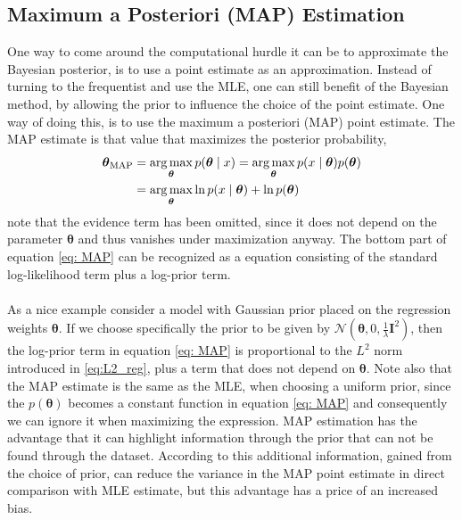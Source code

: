 \subsection{Maximum a Posteriori (MAP) Estimation}
One way to come around the computational hurdle it can be to approximate the Bayesian posterior, is to use a point estimate as an approximation. Instead of turning to the frequentist and use the MLE, one can still benefit of the Bayesian method, by allowing the prior to influence the choice of the point estimate. One way of doing this, is to use the maximum a posteriori (MAP) point estimate. The MAP estimate is that value that maximizes the posterior probability,
\begin{equation}\label{eq: MAP}
  \begin{split}
        \boldsymbol{\theta}_{\text{MAP}}&=\operatorname*{arg\,max}_{\boldsymbol{\theta}}{p(\boldsymbol{\theta}\mid x})=\operatorname*{arg\,max}_{\boldsymbol{\theta}}{p(x\mid \boldsymbol{\theta}}) p(\boldsymbol{\theta})\\
        &=\operatorname*{arg\,max}_{\boldsymbol{\theta}}{\ln p(x\mid \boldsymbol{\theta}})+ \ln p(\boldsymbol{\theta})
  \end{split}
\end{equation}
note that the evidence term has been omitted, since it does not depend on the parameter $\boldsymbol{\theta}$ and thus vanishes under maximization anyway. The bottom part of equation \ref{eq: MAP} can be recognized as a equation consisting of the standard log-likelihood term plus a log-prior term. \\
\\
As a nice example consider a model with Gaussian prior placed on the regression weights $\boldsymbol{\theta}$. If we choose specifically the prior to be given by $\mathcal{N}\left(\boldsymbol{\theta},0,\frac{1}{\lambda}\boldsymbol{I}^2\right)$, then the log-prior term in equation \ref{eq: MAP} is proportional to the $L^2$ norm introduced in \ref{eq:L2_reg}, plus a term that does not depend on $\boldsymbol{\theta}$.
Note also that the MAP estimate is the same as the MLE, when choosing a uniform prior, since the $p(\boldsymbol{\theta})$ becomes a constant function in equation \ref{eq: MAP} and consequently we can ignore it when maximizing the expression. MAP estimation has the advantage that it can highlight information through the prior that can not be found through the dataset. According to \cite{Goodfellow-et-al-2016} this additional information, gained from the choice of prior, can reduce the variance in the MAP point estimate in direct comparison with MLE estimate, but this advantage has a price of an increased bias.\\
